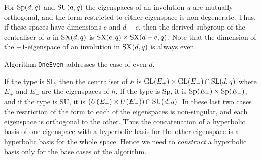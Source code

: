 \documentclass[12pt]{article}
\def\SL{{\rm SL}}
\def\GL{{\rm GL}}
\def\Sp{{\rm Sp}}
\def\SU{{\rm SU}}
\def\SX{{\rm SX}}
\begin{document}
For $\Sp(d,q)$ and $\SU(d,q)$ the
eigenspaces of an involution $u$ are mutually orthogonal, and the form
restricted to either eigenspace is non-degenerate. Thus, if these
spaces have dimensions $e$ and $d-e$, then the derived subgroup of the
centraliser of $u$ in $\SX(d,q)$ is $\SX(e,q)\times\SX(d-e,q)$. Note
that the dimension of the $-1$-eigenspace of an involution in
$\SX(d,q)$ is always even.

Algorithm {\tt OneEven} addresses the case of even $d$.


If the type is SL, then the centraliser of $h$ is 
$\GL(E_+)\times\GL(E_-)\cap\SL(d,q)$ where $E_+$ and $E_-$ are the
eigenspaces  of $h$. If the type is Sp, it is
$\Sp(E_+)\times\Sp(E_-)$, and if the type is SU, it is
$(U(E_+)\times U(E_-))\cap\SU(d,q)$. In these last two
cases the restriction of the form to each of the eigenspaces is
non-singular, and each eigenspace is orthogonal to the other. Thus
the concatenation of a hyperbolic basis of one eigenspace with a
hyperbolic basis for the other eigenspace is a hyperbolic basis for
the whole space. Hence we need to {\it construct} a hyperbolic 
basis only for the base cases of the algorithm.
\end{document}

